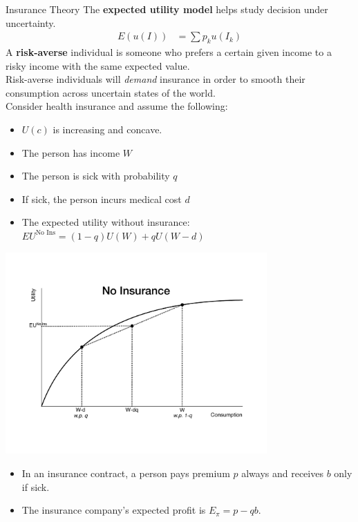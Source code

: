 \documentclass[8pt]{extarticle}
\begin{document}
  \begin{problem}{Insurance Theory}
    The \textbf{expected utility model} helps study decision under uncertainty.
    \begin{align*}
      E(u(I)) &= \sum p_k u(I_k)
    \end{align*}
    A \textbf{risk-averse} individual is someone who prefers a certain given income to a risky income with the same expected value.\\

    Risk-averse individuals will \textit{demand} insurance in order to smooth their consumption across uncertain states of the world.\\

    Consider health insurance and assume the following:
    \begin{itemize}
      \item $U(c)$ is increasing and concave.
      \item The person has income $W$
      \item The person is sick with probability $q$
      \item If sick, the person incurs medical cost $d$
      \item The expected utility without insurance: $EU^{\text{No Ins}} = (1-q)U(W) + qU(W-d)$
    \end{itemize}
    \begin{center}
      \includegraphics[width=10cm]{images/no_insurance_expected_utility.pdf}
    \end{center}
    \begin{itemize}
      \item In an insurance contract, a person pays premium $p$ always and receives $b$ only if sick.
      \item The insurance company's expected profit is $E_{\pi} = p - qb$.

\end{itemize}
\end{problem}
\end{document}
